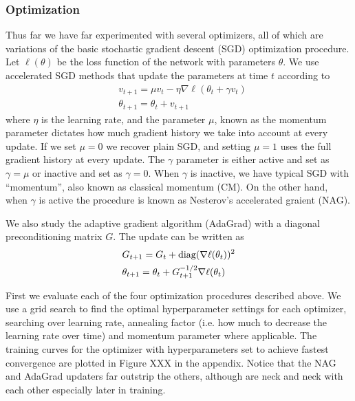 \subsubsection*{Optimization}

Thus far we have far experimented with several optimizers, all of which are
variations of the basic stochastic gradient descent (SGD) optimization
procedure. Let $\ell(\theta)$ be the loss function of the network with
parameters $\theta$. We use accelerated SGD methods that update the parameters
at time $t$ according to
\begin{align*}
&v_{t+1} = \mu v_t - \eta \nabla \ell (\theta_t + \gamma v_t) \\
&\theta_{t+1} = \theta_t + v_{t+1}
\end{align*}
where $\eta$ is the learning rate, and the parameter $\mu$, known as the momentum
parameter dictates how much gradient history we take into account at every
update. If we set $\mu = 0$ we recover plain SGD, and setting $\mu = 1$ uses
the full gradient history at every update.  The $\gamma$ parameter is either
active and set as $\gamma = \mu$ or inactive and set as $\gamma = 0$.  When
$\gamma$ is inactive, we have typical SGD with ``momentum'', also known as
classical momentum (CM). On the other hand, when $\gamma$ is active the
procedure is known as Nesterov's accelerated graient (NAG).

We also study the adaptive gradient algorithm (AdaGrad) with a diagonal
preconditioning matrix $G$. The update can be written as
\begin{align*}
&G_{t+1} = G_{t} + \operatorname*{diag}(\nabla \ell (\theta_t))^2 \\
&\theta_{t+1} = \theta_t + G_{t+1}^{-1/2} \nabla \ell(\theta_t)
\end{align*} 

First we evaluate each of the four optimization procedures described above. We
use a grid search to find the optimal hyperparameter settings for each
optimizer, searching over learning rate, annealing factor (i.e. how much to
decrease the learning rate over time) and momentum parameter where applicable.
The training curves for the optimizer with hyperparameters set to achieve
fastest convergence are plotted in Figure XXX in the appendix. Notice that the
NAG and AdaGrad updaters far outstrip the others, although are neck and neck
with each other especially later in training.

